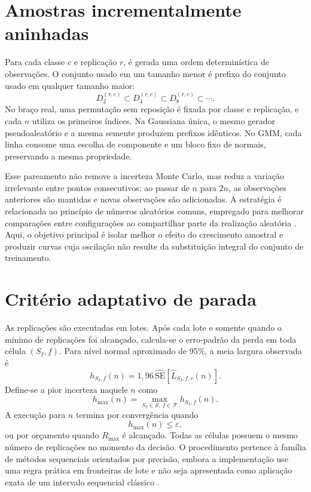 \section{Amostras incrementalmente aninhadas}

Para cada classe $c$ e replicação $r$, é gerada uma ordem determinística de observações. O conjunto usado em um tamanho menor é prefixo do conjunto usado em qualquer tamanho maior:
\begin{equation}
  D^{(r,c)}_{2}\subset D^{(r,c)}_{4}\subset D^{(r,c)}_{8}\subset\cdots.
  \label{eq:nested-samples}
\end{equation}
No braço real, uma permutação sem reposição é fixada por classe e replicação, e cada $n$ utiliza os primeiros índices. Na Gaussiana única, o mesmo gerador pseudoaleatório e a mesma semente produzem prefixos idênticos. No GMM, cada linha consome uma escolha de componente e um bloco fixo de normais, preservando a mesma propriedade.

Esse pareamento não remove a incerteza Monte Carlo, mas reduz a variação irrelevante entre pontos consecutivos: ao passar de $n$ para $2n$, as observações anteriores são mantidas e novas observações são adicionadas. A estratégia é relacionada ao princípio de números aleatórios comuns, empregado para melhorar comparações entre configurações ao compartilhar parte da realização aleatória \cite{Kahn1953}. Aqui, o objetivo principal é isolar melhor o efeito do crescimento amostral e produzir curvas cuja oscilação não resulte da substituição integral do conjunto de treinamento.

\section{Critério adaptativo de parada}

As replicações são executadas em lotes. Após cada lote e somente quando o mínimo de replicações foi alcançado, calcula-se o erro-padrão da perda em toda célula $(S_I,f)$. Para nível normal aproximado de 95\%, a meia largura observada é
\begin{equation}
  h_{S_I,f}(n)=1{,}96\,\widehat{\mathrm{SE}}\!\left[
  \widehat{L}_{S_I,f,r}(n)\right].
\end{equation}
Define-se a pior incerteza naquele $n$ como
\begin{equation}
  h_{\max}(n)=\max_{S_I\in\mathcal{S},\,f\in\mathcal{F}}h_{S_I,f}(n).
\end{equation}
A execução para $n$ termina por convergência quando
\begin{equation}
  h_{\max}(n)\leq\varepsilon,
  \label{eq:stopping}
\end{equation}
ou por orçamento quando $R_{\max}$ é alcançado. Todas as células possuem o mesmo número de replicações no momento da decisão. O procedimento pertence à família de métodos sequenciais orientados por precisão, embora a implementação use uma regra prática em fronteiras de lote e não seja apresentada como aplicação exata de um intervalo sequencial clássico \cite{ChowRobbins1965}.

